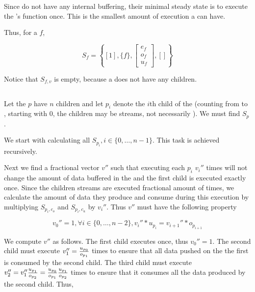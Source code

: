 Since {\filters} do not have any internal buffering, their minimal
steady state is to execute the {\filter}'s {\work} function once.
This is the smallest amount of execution a {\filter} can have.

Thus, for a {\filter} $f$,

\begin{displaymath}
S_f = \left\{[1], \{f\}, { \left[
\begin{array}{c}e_f\\o_f\\u_f
\end{array}
\right]}, [] \right\}
\end{displaymath}

Notice that $S_{f,v}$ is empty, because a {\filter} does not have
any children.

\subsection{\pipeline}

Let the {\pipeline} $p$ have $n$ children and let $p_i$ denote the
$i$th child of the {\pipeline} (counting from {\Input} to
{\Output}, starting with 0, the children may be streams, not
necessarily {\filters}). We must find $S_p$.

We start with calculating all $S_{p_i}, i \in \{0, \dots, n-1\}$.
This task is achieved recursively.

Next we find a fractional vector $v''$ such that executing each
$p_i$ $v_i''$ times will not change the amount of data buffered in
the {\pipeline} and the first child is executed exactly once.
Since the children streams are executed fractional amount of
times, we calculate the amount of data they produce and consume
during this execution by multiplying $S_{p_i,c_o}$ and
$S_{p_i,c_u}$ by $v_i''$. Thus $v''$ must have the following
property

\begin{displaymath}
v_0'' = 1, \forall i \in \{0,\dots,n-2\}, v_i'' * u_{p_i} =
v_{i+1}'' * o_{p_{i+1}}
\end{displaymath}

We compute $v''$ as follows.  The first child executes once, thus
$v_0'' = 1$.  The second child must execute $v_1'' = {u_{p_0}
\over {o_{p_1}}}$ times to ensure that all data pushed on the the
first {\Channel} is consumed by the second child.  The third
child must execute $v_2'' = v_1'' {u_{p_1} \over o_{p_2}} =
{u_{p_0} \over o_{p_1}} {u_{p_1} \over o_{p_2}}$ times to ensure
that it consumes all the data produced by the second child. Thus,

